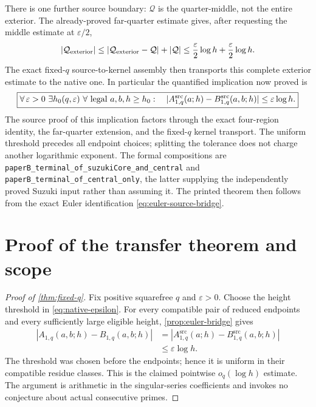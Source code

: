 \documentclass[11pt]{article}
\theoremstyle{definition}
\theoremstyle{remark}
\newcommand{\1}{\mathbf 1}
\begin{document}
There is one further source boundary: $\mathcal Q$ is the
quarter-middle, not the entire exterior. The already-proved
far-quarter estimate gives, after requesting the middle estimate
at $\varepsilon/2$,
\begin{equation}\label{eq:far-quarter-budget}
 |\mathcal Q_{\rm exterior}|\le
 |\mathcal Q_{\rm exterior}-\mathcal Q|+|\mathcal Q|
 \le\frac\varepsilon2\log h+\frac\varepsilon2\log h.
\end{equation}
The exact fixed-$q$ source-to-kernel assembly then transports this
complete exterior estimate to the native one. In particular the
quantified implication now proved is
\begin{equation}\label{eq:native-epsilon}
 \boxed{\forall\,\varepsilon>0\ \exists h_0(q,\varepsilon)\ \forall
 \text{ legal }a,b,h\ge h_0:\quad
 |A^{\rm src}_{1,q}(a;h)-B^{\rm src}_{1,q}(a,b;h)|
 \le\varepsilon\log h.}
\end{equation}
The source proof of this implication factors through the exact
four-region identity, the far-quarter extension, and the
fixed-$q$ kernel transport. The uniform threshold precedes all
endpoint choices; splitting the tolerance does not charge another
logarithmic exponent. The formal compositions are
\texttt{paperB\_terminal\_of\_suzukiCore\_and\_central} and
\texttt{paperB\_terminal\_of\_central\_only}, the latter
supplying the independently proved Suzuki input rather than
assuming it. The printed theorem then follows from the exact
Euler identification \eqref{eq:euler-source-bridge}.

\section{Proof of the transfer theorem and scope}\label{sec:proof-main}

\begin{proof}[Proof of \cref{thm:fixed-q}]
Fix positive squarefree $q$ and $\varepsilon>0$. Choose the
height threshold in \eqref{eq:native-epsilon}. For every
compatible pair of reduced endpoints and every sufficiently
large eligible height, \cref{prop:euler-bridge} gives
\[
\begin{aligned}
 |A_{1,q}(a,b;h)-B_{1,q}(a,b;h)|
 &=|A^{\mathrm{src}}_{1,q}(a;h)
      -B^{\mathrm{src}}_{1,q}(a,b;h)|\\
 &\le\varepsilon\log h.
\end{aligned}
\]
The threshold was chosen before the endpoints; hence it is
uniform in their compatible residue classes. This is the claimed
pointwise $o_q(\log h)$ estimate. The argument is arithmetic
in the singular-series coefficients and invokes no conjecture
about actual consecutive primes.
\end{proof}
\end{document}
